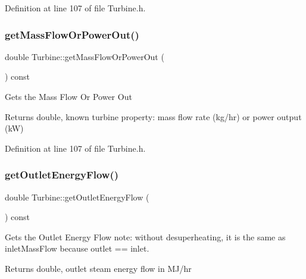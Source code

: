Definition at line 107 of file Turbine.\+h.

\mbox{\label{class_turbine_a820a090d264b96ee84f717555545c287}} 
\subsubsection{\texorpdfstring{get\+Mass\+Flow\+Or\+Power\+Out()}{getMassFlowOrPowerOut()}\hspace{0.1cm}{\footnotesize\ttfamily [3/3]}}
{\footnotesize\ttfamily double Turbine\+::get\+Mass\+Flow\+Or\+Power\+Out (\begin{DoxyParamCaption}{ }\end{DoxyParamCaption}) const\hspace{0.3cm}{\ttfamily [inline]}}

Gets the Mass Flow Or Power Out

\begin{DoxyReturn}{Returns}
double, known turbine property\+: mass flow rate (kg/hr) or power output (kW) 
\end{DoxyReturn}


Definition at line 107 of file Turbine.\+h.

\mbox{\label{class_turbine_aa20c0f9dd81cd9bfd5eda77f588516b5}} 
\subsubsection{\texorpdfstring{get\+Outlet\+Energy\+Flow()}{getOutletEnergyFlow()}\hspace{0.1cm}{\footnotesize\ttfamily [1/3]}}
{\footnotesize\ttfamily double Turbine\+::get\+Outlet\+Energy\+Flow (\begin{DoxyParamCaption}{ }\end{DoxyParamCaption}) const\hspace{0.3cm}{\ttfamily [inline]}}

Gets the Outlet Energy Flow note\+: without desuperheating, it is the same as inlet\+Mass\+Flow because outlet == inlet. \begin{DoxyReturn}{Returns}
double, outlet steam energy flow in M\+J/hr 
\end{DoxyReturn}


